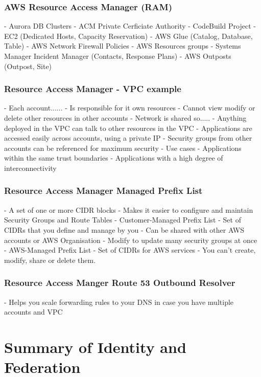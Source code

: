 \documentclass[11pt]{book}
\begin{document}
    \subsubsection{AWS Resource Access Manager (RAM)}
    - Aurora DB Clusters
    - ACM Private Cerficiate Authority
    - CodeBuild Project
    - EC2 (Dedicated Hosts, Capacity Reservation)
    - AWS Glue (Catalog, Database, Table)
    - AWS Network Firewall Policies
    - AWS Resources groups
    - Systems Manager Incident Manager (Contacts, Response Plans)
    - AWS Outposts (Outpost, Site)

    \subsubsection{Resource Access Manager - VPC example}
    - Each account......
    - Is responsible for it own resources
    - Cannot view modify or delete other resources in other accounts
    - Network is shared so.....
    - Anything deployed in the VPC can talk to other resources in the VPC
    - Applications are accessed easily across accounts, using a private IP
    - Security groups from other accounts can be referenced for maximum security
    - Use cases
    - Applications within the same trust boundaries
    - Applications with a high degree of interconnectivity

    \subsubsection{Resource Access Manager Managed Prefix List}
    - A set of one or more CIDR blocks
    - Makes it easier to configure and maintain Security Groups and Route Tables
    - Customer-Managed Prefix List
    - Set of CIDRs that you define and manage by you
    - Can be shared with other AWS accounts or AWS Organisation
    - Modify to update many security groups at once
    - AWS-Managed Prefix List
    - Set of CIDRs for AWS services
    - You can't create, modify, share or delete them.

    \subsubsection{Resource Access Manger Route 53 Outbound Resolver}
    - Helps you scale forwarding rules to your DNS in case you have multiple accounts and VPC


    \section{Summary of Identity and Federation}
\end{document}

